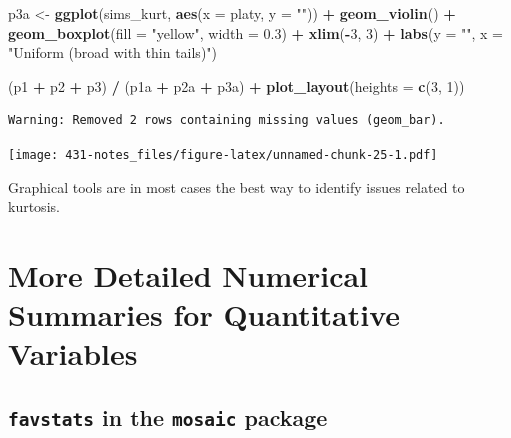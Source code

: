 \documentclass[
]{book}
\newenvironment{Shaded}{\begin{snugshade}}{\end{snugshade}}
\newcommand{\DataTypeTok}[1]{\textcolor[rgb]{0.13,0.29,0.53}{#1}}
\newcommand{\DecValTok}[1]{\textcolor[rgb]{0.00,0.00,0.81}{#1}}
\newcommand{\FloatTok}[1]{\textcolor[rgb]{0.00,0.00,0.81}{#1}}
\newcommand{\KeywordTok}[1]{\textcolor[rgb]{0.13,0.29,0.53}{\textbf{#1}}}
\newcommand{\NormalTok}[1]{#1}
\newcommand{\OperatorTok}[1]{\textcolor[rgb]{0.81,0.36,0.00}{\textbf{#1}}}
\newcommand{\StringTok}[1]{\textcolor[rgb]{0.31,0.60,0.02}{#1}}
\begin{document}
\begin{Shaded}
\begin{Highlighting}[]
\NormalTok{p3a <-}\StringTok{ }\KeywordTok{ggplot}\NormalTok{(sims_kurt, }\KeywordTok{aes}\NormalTok{(}\DataTypeTok{x =}\NormalTok{ platy, }\DataTypeTok{y =} \StringTok{""}\NormalTok{)) }\OperatorTok{+}
\StringTok{  }\KeywordTok{geom_violin}\NormalTok{() }\OperatorTok{+}
\StringTok{  }\KeywordTok{geom_boxplot}\NormalTok{(}\DataTypeTok{fill =} \StringTok{"yellow"}\NormalTok{, }\DataTypeTok{width =} \FloatTok{0.3}\NormalTok{) }\OperatorTok{+}\StringTok{ }
\StringTok{  }\KeywordTok{xlim}\NormalTok{(}\OperatorTok{-}\DecValTok{3}\NormalTok{, }\DecValTok{3}\NormalTok{) }\OperatorTok{+}
\StringTok{  }\KeywordTok{labs}\NormalTok{(}\DataTypeTok{y =} \StringTok{""}\NormalTok{, }\DataTypeTok{x =} \StringTok{"Uniform (broad with thin tails)"}\NormalTok{)}


\NormalTok{(p1 }\OperatorTok{+}\StringTok{ }\NormalTok{p2 }\OperatorTok{+}\StringTok{ }\NormalTok{p3) }\OperatorTok{/}\StringTok{ }\NormalTok{(p1a }\OperatorTok{+}\StringTok{ }\NormalTok{p2a }\OperatorTok{+}\StringTok{ }\NormalTok{p3a) }\OperatorTok{+}\StringTok{ }
\StringTok{  }\KeywordTok{plot_layout}\NormalTok{(}\DataTypeTok{heights =} \KeywordTok{c}\NormalTok{(}\DecValTok{3}\NormalTok{, }\DecValTok{1}\NormalTok{))}
\end{Highlighting}
\end{Shaded}

\begin{verbatim}
Warning: Removed 2 rows containing missing values (geom_bar).
\end{verbatim}

\texttt{[image: 431-notes\_files/figure-latex/unnamed-chunk-25-1.pdf]}

Graphical tools are in most cases the best way to identify issues related to kurtosis.

\hypertarget{more-detailed-numerical-summaries-for-quantitative-variables}{%
\section{More Detailed Numerical Summaries for Quantitative Variables}\label{more-detailed-numerical-summaries-for-quantitative-variables}}

\hypertarget{favstats-in-the-mosaic-package}{%
\subsection{\texorpdfstring{\texttt{favstats} in the \texttt{mosaic} package}{favstats in the mosaic package}}\label{favstats-in-the-mosaic-package}}
\end{document}
